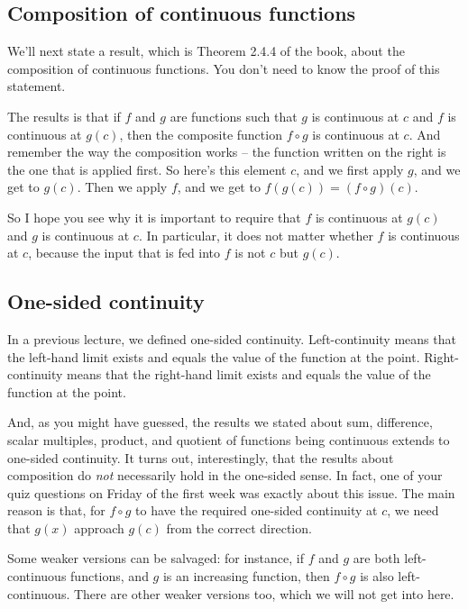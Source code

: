\documentclass[10pt]{amsart}
\begin{document}
\subsection{Composition of continuous functions}

We'll next state a result, which is Theorem 2.4.4 of the book, about
the composition of continuous functions. You don't need to know the
proof of this statement.

The results is that if $f$ and $g$ are functions such that $g$ is
continuous at $c$ and $f$ is continuous at $g(c)$, then the composite
function $f \circ g$ is continuous at $c$. And remember the way the
composition works -- the function written on the right is the one that
is applied first. So here's this element $c$, and we first apply $g$,
and we get to $g(c)$. Then we apply $f$, and we get to $f(g(c)) = (f
\circ g)(c)$.

So I hope you see why it is important to require that $f$ is
continuous at $g(c)$ and $g$ is continuous at $c$. In particular, it
does not matter whether $f$ is continuous at $c$, because the input
that is fed into $f$ is not $c$ but $g(c)$.

\subsection{One-sided continuity}

In a previous lecture, we defined one-sided
continuity. Left-continuity means that the left-hand limit exists and
equals the value of the function at the point. Right-continuity means
that the right-hand limit exists and equals the value of the function
at the point.

And, as you might have guessed, the results we stated about sum,
difference, scalar multiples, product, and quotient of functions being
continuous extends to one-sided continuity. It turns out,
interestingly, that the results about composition do {\em not}
necessarily hold in the one-sided sense. In fact, one of your quiz
questions on Friday of the first week was exactly about this
issue. The main reason is that, for $f \circ g$ to have the required
one-sided continuity at $c$, we need that $g(x)$ approach $g(c)$ from
the correct direction.

Some weaker versions can be salvaged: for instance, if $f$ and $g$ are
both left-continuous functions, and $g$ is an increasing function,
then $f \circ g$ is also left-continuous. There are other weaker
versions too, which we will not get into here.
\end{document}
